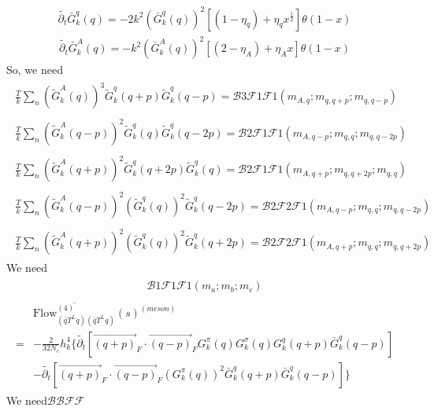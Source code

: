 \documentclass[12pt]{article}
\begin{document}
\begin{eqnarray}
\tilde{\partial_t}  \bar G^q_k (q) = -2k^2 (\bar G^q_k(q))^2 [(1-\eta_q)+\eta_q x^{\frac{1}{2}}]\theta(1-x)
\end{eqnarray}
\begin{eqnarray}
\tilde{\partial_t}  \bar G^{A}_k (q) = -k^2 (\bar G^{A}_k(q))^2 [(2-\eta_A)+\eta_A x]\theta(1-x)
\end{eqnarray}
So, we need
\begin{eqnarray}
\begin{split}
\frac{T}{k} \sum_n (\tilde G^A_k(q))^3 \tilde G^{q}_k(q+p)\tilde G^{q}_k(q-p)  =\mathcal{B}3\mathcal{F}1\mathcal{F}1(m_{A,q};m_{q,q+p};m_{q,q-p})
\end{split}
\end{eqnarray}
\begin{eqnarray}
\begin{split}
\frac{T}{k} \sum_n (\tilde G^A_k(q-p))^2 \tilde G^{q}_k(q)\tilde G^{q}_k(q-2p)  =\mathcal{B}2\mathcal{F}1\mathcal{F}1(m_{A,q-p};m_{q,q};m_{q,q-2p})
\end{split}
\end{eqnarray}
\begin{eqnarray}
\begin{split}
\frac{T}{k} \sum_n (\tilde G^A_k(q+p))^2 \tilde G^{q}_k(q+2p)\tilde G^{q}_k(q)  =\mathcal{B}2\mathcal{F}1\mathcal{F}1(m_{A,q+p};m_{q,q+2p};m_{q,q})
\end{split}
\end{eqnarray}
\begin{eqnarray}
\begin{split}
\frac{T}{k} \sum_n (\tilde G^A_k(q-p))^2 (\tilde G^{q}_k(q))^2\tilde G^{q}_k(q-2p)  =\mathcal{B}2\mathcal{F}2\mathcal{F}1(m_{A,q-p};m_{q,q};m_{q,q-2p})
\end{split}
\end{eqnarray}
\begin{eqnarray}
\begin{split}
\frac{T}{k} \sum_n (\tilde G^A_k(q+p))^2 (\tilde G^{q}_k(q))^2\tilde G^{q}_k(q+2p)  =\mathcal{B}2\mathcal{F}2\mathcal{F}1(m_{A,q+p};m_{q,q};m_{q,q+2p})
\end{split}
\end{eqnarray}
We need
\begin{eqnarray}
\begin{split}
\mathcal{B}1\mathcal{F}1\mathcal{F}1(m_a;m_b;m_c)
\end{split}
\end{eqnarray}
\begin{eqnarray}
\begin{split}
&\overline{ \text{Flow}_{(\bar q T^L q) (\bar q T^L q)}^{(4)}}(s)^{(meson)}\\
=&- \frac{2}{32N_c} h_k^4\big \{\tilde{\partial_t}[\overrightarrow{(q+p)}_F \cdot \overrightarrow{(q-p)}_F G^{\pi}_k (q) G^{\sigma}_k(q) G_k^q(q+p) \bar G_k^q (q-p)]\\
&-\tilde{\partial_t}[\overrightarrow{(q+p)}_F \cdot \overrightarrow{(q-p)}_F (G^{\pi}_k (q))^2\bar G_k^q(q+p) \bar G_k^q (q-p)] \big \}
\end{split}
\end{eqnarray}
We need$ \mathcal{B}\mathcal{B}\mathcal{F}\mathcal{F}$
\end{document}
